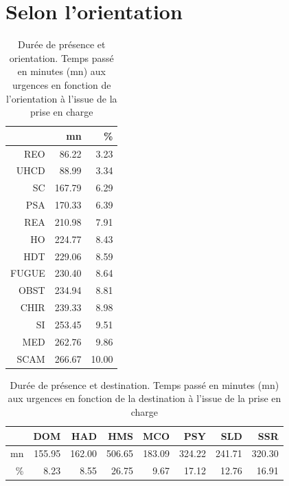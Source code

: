 \documentclass[12pt,english,french,twoside]{book}\usepackage[]{graphicx}\usepackage[]{color}
\begin{document}
\section{Selon l'orientation}
\begin{table}[ht]
\centering
\begin{tabular}{rrr}
  \hline
 & mn & \% \\ 
  \hline
REO & 86.22 & 3.23 \\ 
  UHCD & 88.99 & 3.34 \\ 
  SC & 167.79 & 6.29 \\ 
  PSA & 170.33 & 6.39 \\ 
  REA & 210.98 & 7.91 \\ 
  HO & 224.77 & 8.43 \\ 
  HDT & 229.06 & 8.59 \\ 
  FUGUE & 230.40 & 8.64 \\ 
  OBST & 234.94 & 8.81 \\ 
  CHIR & 239.33 & 8.98 \\ 
  SI & 253.45 & 9.51 \\ 
  MED & 262.76 & 9.86 \\ 
  SCAM & 266.67 & 10.00 \\ 
   \hline
\end{tabular}
\caption[Durée de présence et orientation]{Durée de présence et orientation. Temps passé en minutes (mn) aux urgences en fonction de l'orientation à l'issue de la prise en charge} 
\label{tab:duree_orientation}
\end{table}
\begin{table}[ht]
\centering
\begin{tabular}{rrrrrrrr}
  \hline
 & DOM & HAD & HMS & MCO & PSY & SLD & SSR \\ 
  \hline
mn & 155.95 & 162.00 & 506.65 & 183.09 & 324.22 & 241.71 & 320.30 \\ 
  \% & 8.23 & 8.55 & 26.75 & 9.67 & 17.12 & 12.76 & 16.91 \\ 
   \hline
\end{tabular}
\caption[Durée de présence et destination]{Durée de présence et destination. Temps passé en minutes (mn) aux urgences en fonction de la destination à l'issue de la prise en charge} 
\label{tab:duree_destination}
\end{table}
\end{document}
